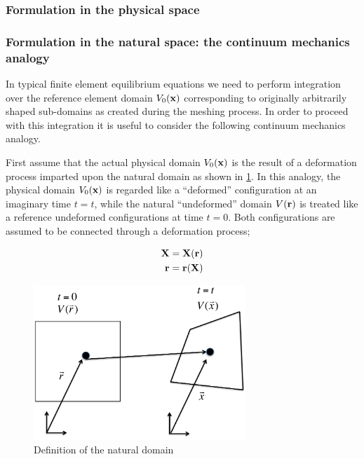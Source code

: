 \subsubsection{Formulation in the physical space}
\subsubsection{Formulation in the natural space: the continuum mechanics analogy}
In typical finite element equilibrium equations we need to perform integration over the reference element domain $V_0(\vb{x})$ corresponding to originally arbitrarily shaped sub-domains as created during the meshing process.  In order to proceed with this integration it is useful to consider the following continuum mechanics analogy.

First assume that the actual physical domain $V_0(\vb{x})$ is the result of a deformation process imparted upon the natural domain as shown in \cref{fig:natural domain}. In this analogy, the physical domain $V_0(\vb{x})$ is regarded like a ``deformed'' configuration at an imaginary time $t=t$, while the natural ``undeformed'' domain $V(\vb{r})$   is treated like a reference undeformed configurations at time $t=0$. Both configurations are assumed to be connected through a deformation process;


\begin{equation}
\begin{aligned}
\vb{X}&=\vb{X}(\vb{r})\\
\vb{r}&=\vb{r}(\vb{X})
\end{aligned}
\label{eq:motion}
\end{equation}

\begin{figure}[h]
\centering
\includegraphics[width=8cm]{img/figure1.pdf}
\caption{Definition of the natural domain}
\label{fig:natural domain}
\end{figure}

 

